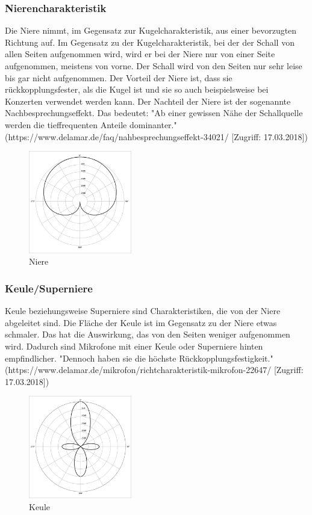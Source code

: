 \subsubsection{Nierencharakteristik}
Die Niere nimmt, im Gegensatz zur Kugelcharakteristik, aus einer bevorzugten Richtung auf. Im Gegensatz zu der Kugelcharakteristik, bei der der Schall von allen Seiten aufgenommen wird, wird er bei der Niere nur von einer Seite aufgenommen, meistens von vorne. Der Schall wird von den Seiten nur sehr leise bis gar nicht aufgenommen. Der Vorteil der Niere ist, dass sie rückkopplungsfester, als die Kugel ist und sie so auch beispielsweise bei Konzerten verwendet werden kann. Der Nachteil der Niere ist der sogenannte Nachbesprechungseffekt.\citep{naheffekt}\citep{kugel} Das bedeutet: "Ab einer gewissen Nähe der Schallquelle werden die tieffrequenten Anteile dominanter." (https://www.delamar.de/faq/nahbesprechungseffekt-34021/ [Zugriff: 17.03.2018])
\begin{figure}[H]
	\centering
	\includegraphics[width=0.4\textwidth]{abb5} 
	\caption[Niere]{Niere\footnotemark}
\end{figure}
\subsubsection{Keule/Superniere}
Keule beziehungsweise Superniere sind Charakteristiken, die von der Niere abgeleitet sind. Die Fläche der Keule ist im Gegensatz zu der Niere etwas schmaler. Das hat die Auswirkung, das von den Seiten weniger aufgenommen wird. Dadurch sind Mikrofone mit einer Keule oder Superniere hinten empfindlicher.\citep{kugel} "Dennoch haben sie die höchste Rückkopplungsfestigkeit." (https://www.delamar.de/mikrofon/richtcharakteristik-mikrofon-22647/ [Zugriff: 17.03.2018])
\begin{figure}[H]
	\centering
	\includegraphics[width=0.4\textwidth]{abb6} 
	\caption[Keule]{Keule\footnotemark}
\end{figure}
